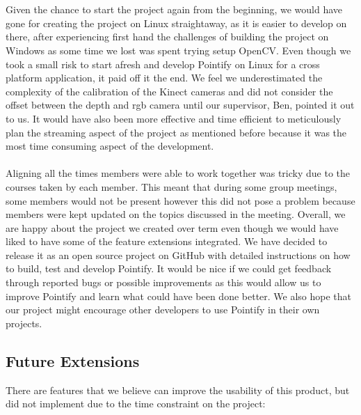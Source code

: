 \documentclass{article}
\begin{document}
\\\\
Given the chance to start the project again from the beginning, we would have gone for creating the project on Linux straightaway, as it is easier to develop on there, after experiencing first hand the challenges of building the project on Windows as some time we lost was spent trying setup OpenCV. Even though we took a small risk to start afresh and develop Pointify on Linux for a cross platform application, it paid off it the end. We feel we underestimated the complexity of the calibration of the Kinect cameras and did not consider the offset between the depth and rgb camera until our supervisor, Ben, pointed it out to us. It would have also been more effective and time efficient to meticulously plan the streaming aspect of the project as mentioned before because it was the most time consuming aspect of the development.
\\\\
Aligning all the times members were able to work together was tricky due to the courses taken by each member. This meant that during some group meetings, some members would not be present however this did not pose a problem because members were kept updated on the topics discussed in the meeting. Overall, we are happy about the project we created over term even though we would have liked to have some of the feature extensions integrated. We have decided to release it as an open source project on GitHub with detailed instructions on how to build, test and develop Pointify. It would be nice if we could get feedback through reported bugs or possible improvements as this would allow us to improve Pointify and learn what could have been done better. We also hope that our project might encourage other developers to use Pointify in their own projects. 
\newpage
\subsection{Future Extensions}
There are features that we believe can improve the usability of this product, but did not implement due to the time constraint on the project:
\end{document}
